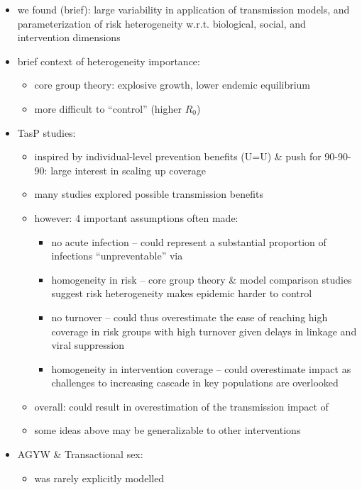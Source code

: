 \begin{itemize}
  \item we found (brief): large variability in application of transmission models,
  and parameterization of risk heterogeneity w.r.t. biological, social, and intervention dimensions
  \item brief context of heterogeneity importance:
  \begin{itemize}
    \item core group theory: explosive growth, lower endemic equilibrium
    \item more difficult to ``control'' (higher $R_0$)
  \end{itemize}
  \item TasP studies:
  \begin{itemize}
    \item inspired by individual-level prevention benefits (U=U) \& push for 90-90-90:
          large interest in scaling up \art coverage
    \item many studies explored possible transmission benefits
    \item however: 4 important assumptions often made:
    \begin{itemize}
      \item no acute infection -- could represent
            a substantial proportion of infections ``unpreventable'' via \tasp
      \item homogeneity in risk -- core group theory \& model comparison studies suggest
            risk heterogeneity makes epidemic harder to control
      \item no turnover -- could thus overestimate
            the ease of reaching high \art coverage in risk groups with high turnover
            given delays in linkage and viral suppression
      \item homogeneity in intervention coverage -- could overestimate impact
            as challenges to increasing cascade in key populations are overlooked
    \end{itemize}
    \item overall: could result in overestimation of the transmission impact of \tasp
    \item some ideas above may be generalizable to other interventions
  \end{itemize}
  \item AGYW \& Transactional sex:
  \begin{itemize}
    \item was rarely explicitly modelled

\end{itemize}
\end{itemize}

